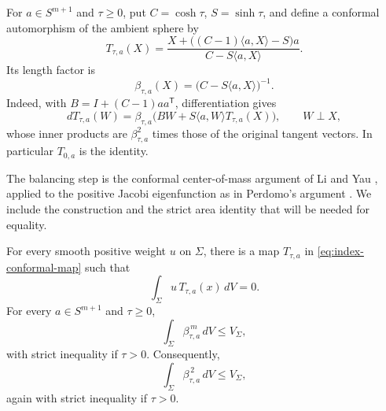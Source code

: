 For $a\in S^{m+1}$ and $\tau\ge0$, put $C=\cosh\tau$, $S=\sinh\tau$,
and define a conformal automorphism of the ambient sphere by
\begin{equation}\label{eq:index-conformal-map}
 T_{\tau,a}(X)=
 \frac{X+\bigl((C-1)\langle a,X\rangle-S\bigr)a}
      {C-S\langle a,X\rangle}.
\end{equation}
Its length factor is
\begin{equation}\label{eq:index-conformal-factor}
 \beta_{\tau,a}(X)=\bigl(C-S\langle a,X\rangle\bigr)^{-1}.
\end{equation}
Indeed, with $B=I+(C-1)aa^{\mathsf T}$, differentiation gives
\[
 dT_{\tau,a}(W)=\beta_{\tau,a}
       \bigl(BW+S\langle a,W\rangle T_{\tau,a}(X)\bigr),
 \qquad W\perp X,
\]
whose inner products are $\beta_{\tau,a}^2$ times those of the original
tangent vectors.  In particular $T_{0,a}$ is the identity.

The balancing step is the conformal center-of-mass argument of Li and
Yau \cite[proof of Theorem~1, p.~274]{LiYau1982}, applied to the positive
Jacobi eigenfunction as in Perdomo's argument
\cite[Theorem~3.1]{Perdomo2004}. We include the construction and the strict
area identity that will be needed for equality.

\begin{lemma}
\label{lem:index-conformal-tests}
For every smooth positive weight $u$ on $\Sigma$, there is a map
$T_{\tau,a}$ in \eqref{eq:index-conformal-map} such that
\begin{equation}\label{eq:index-balance}
 \int_\Sigma u\,T_{\tau,a}(x)\,dV=0.
\end{equation}
For every $a\in S^{m+1}$ and $\tau\ge0$,
\begin{equation}\label{eq:index-conformal-area}
 \int_\Sigma\beta_{\tau,a}^{\,m}\,dV\le V_\Sigma,
\end{equation}
with strict inequality if $\tau>0$.  Consequently,
\begin{equation}\label{eq:index-conformal-energy}
 \int_\Sigma\beta_{\tau,a}^{\,2}\,dV\le V_\Sigma,
\end{equation}
again with strict inequality if $\tau>0$.
\end{lemma}

